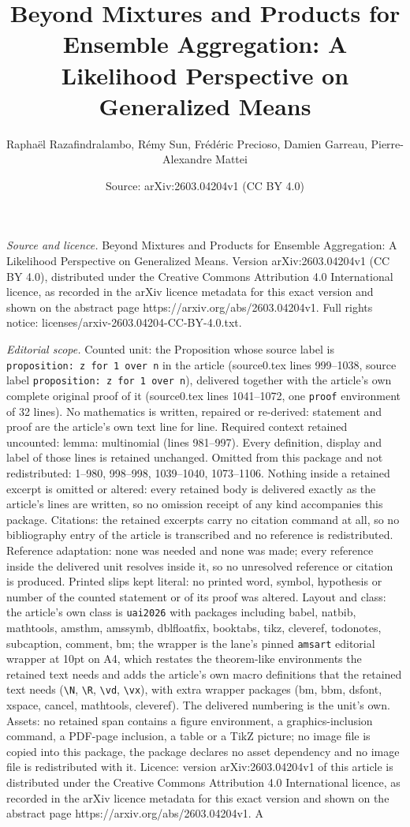 \documentclass[10pt,a4paper]{amsart}
\title[Beyond Mixtures and Products for Ensemble Aggregation: A Lik]{Beyond Mixtures and Products for Ensemble Aggregation: A Likelihood Perspective on Generalized Means}
\author{Rapha\"el Razafindralambo, R\'emy Sun, Fr\'ed\'eric Precioso, Damien Garreau, Pierre-Alexandre Mattei}
\date{Source: arXiv:2603.04204v1 (CC BY 4.0)}
\begin{document}
\maketitle

\noindent\emph{Source and licence.} Beyond Mixtures and Products for Ensemble Aggregation: A Likelihood Perspective on Generalized Means. Version arXiv:2603.04204v1 (CC BY 4.0), distributed under the Creative Commons Attribution 4.0 International licence, as recorded in the arXiv licence metadata for this exact version and shown on the abstract page https://arxiv.org/abs/2603.04204v1. Full rights notice: licenses/arxiv-2603.04204-CC-BY-4.0.txt.\par\smallskip

\noindent\textit{Editorial scope.} Counted unit: the Proposition whose source label is \texttt{proposition: z for 1 over n} in the article (source0.tex lines 999--1038, source label \texttt{proposition: z for 1 over n}), delivered together with the article's own complete original proof of it (source0.tex lines 1041--1072, one \texttt{proof} environment of 32 lines). No mathematics is written, repaired or re-derived: statement and proof are the article's own text line for line. Required context retained uncounted: lemma: multinomial (lines 981--997). Every definition, display and label of those lines is retained unchanged. Omitted from this package and not redistributed: 1--980, 998--998, 1039--1040, 1073--1106. Nothing inside a retained excerpt is omitted or altered: every retained body is delivered exactly as the article's lines are written, so no omission receipt of any kind accompanies this package. Citations: the retained excerpts carry no citation command at all, so no bibliography entry of the article is transcribed and no reference is redistributed. Reference adaptation: none was needed and none was made; every reference inside the delivered unit resolves inside it, so no unresolved reference or citation is produced. Printed slips kept literal: no printed word, symbol, hypothesis or number of the counted statement or of its proof was altered. Layout and class: the article's own class is \texttt{uai2026} with packages including babel, natbib, mathtools, amsthm, amssymb, dblfloatfix, booktabs, tikz, cleveref, todonotes, subcaption, comment, bm; the wrapper is the lane's pinned \texttt{amsart} editorial wrapper at 10pt on A4, which restates the theorem-like environments the retained text needs and adds the article's own macro definitions that the retained text needs (\texttt{\textbackslash N}, \texttt{\textbackslash R}, \texttt{\textbackslash vd}, \texttt{\textbackslash vx}), with extra wrapper packages (bm, bbm, dsfont, xspace, cancel, mathtools, cleveref). The delivered numbering is the unit's own. Assets: no retained span contains a figure environment, a graphics-inclusion command, a PDF-page inclusion, a table or a TikZ picture; no image file is copied into this package, the package declares no asset dependency and no image file is redistributed with it. Licence: version arXiv:2603.04204v1 of this article is distributed under the Creative Commons Attribution 4.0 International licence, as recorded in the arXiv licence metadata for this exact version and shown on the abstract page https://arxiv.org/abs/2603.04204v1. A 
\end{document}
